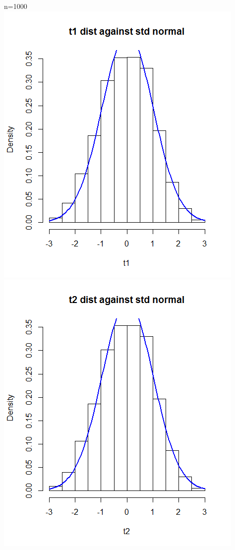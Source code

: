 \documentclass{article}
\begin{document}
\begin{enumerate}
\begin{enumerate}
\begin{center}
										\newline
										n=1000 \newline
										\includegraphics[scale=.5]{t1_1000}
										\includegraphics[scale=.5]{t2_1000}
				\end{center}
				

\end{enumerate}
\end{enumerate}
\end{document}
